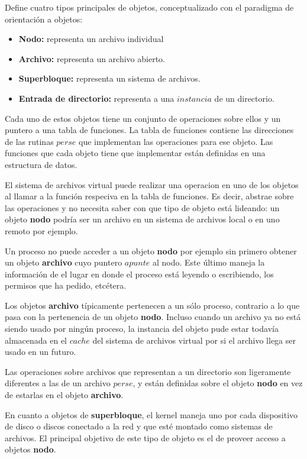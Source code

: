 \documentclass[spanish]{article}
\begin{document}
Define cuatro tipos principales de objetos, conceptualizado con el paradigma de orientaci\'{o}n a objetos:
\begin{itemize}
\item \textbf{Nodo: } representa un archivo individual
\item \textbf{Archivo: } representa un archivo abierto.
\item \textbf{Superbloque: } representa un sistema de archivos.
\item \textbf{Entrada de directorio: } representa a una $instancia$ de un directorio.
\end{itemize}

Cada uno de estos objetos tiene un conjunto de operaciones sobre ellos y un puntero a una tabla de funciones. La tabla de funciones contiene las direcciones de las rutinas $per se$ que implementan las operaciones para ese objeto. Las funciones que cada objeto tiene que implementar est\'{a}n definidas en una estructura de datos.

El sistema de archivos virtual puede realizar una operacion en uno de los objetos al llamar a la funci\'{o}n respeciva en la tabla de funciones. Es decir, abstrae sobre las operaciones y no necesita saber con que tipo de objeto est\'{a} lideando: un objeto \textbf{nodo} podr\'{i}a ser un archivo en un sistema de archivos local o en uno remoto por ejemplo.

Un proceso no puede acceder a un objeto \textbf{nodo} por ejemplo sin primero obtener un objeto \textbf{archivo} cuyo puntero $apunte$ al nodo. Este \'{u}ltimo maneja la informaci\'{o}n de el lugar en donde el proceso est\'{a} leyendo o escribiendo, los permisos que ha pedido, etc\'{e}tera.

Los objetos \textbf{archivo} t\'{i}picamente pertenecen a un sólo proceso, contrario a lo que pasa con la pertenencia de un objeto \textbf{nodo}. Incluso cuando un archivo ya no está siendo usado por ningún proceso, la instancia del objeto pude estar todavía almacenada en el $cache$ del sistema de archivos virtual por si el archivo llega ser usado en un futuro.

Las operaciones sobre archivos que representan a un directorio son ligeramente diferentes a las de un archivo $per se$, y est\'{a}n definidas sobre el objeto \textbf{nodo} en vez de estarlas en el objeto \textbf{archivo}.

En cuanto a objetos de \textbf{superbloque}, el kernel maneja uno por cada dispositivo de disco o discos conectado a la red y que esté montado como sistemas de archivos. El principal objetivo de este tipo de objeto es el de proveer acceso a objetos \textbf{nodo}.
\end{document}
